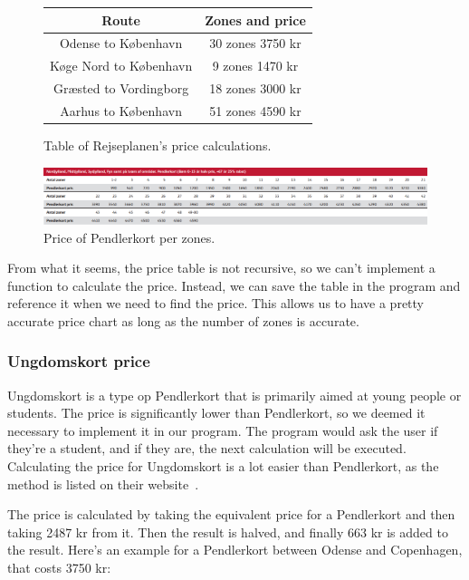 \begin{figure}[H]
    \centering
    \noindent
    \begin{tabular}{ || c | c || }
        \hline
        Route & Zones and price \\
        \hline\hline
        Odense to København & 30 zones 3750 kr \\
        \hline
        Køge Nord to København & 9 zones 1470 kr \\
        \hline
        Græsted to Vordingborg & 18 zones 3000 kr \\
        \hline
        Aarhus to København & 51 zones 4590 kr \\
        \hline
    \end{tabular}
    \caption{Table of Rejseplanen's price calculations.}
    \label{fig:table-rejseplanen-price-calculations}
\end{figure}

\begin{figure}[H]
    \centering
    \includegraphics[width=1\textwidth]{images/dsb-pendlerkort-pris.jpg}
    \caption{Price of Pendlerkort per zones.}
    \label{fig:image-dsb-pendlerkort-pris}
\end{figure}

From what it seems, the price table is not recursive, so we can't implement a function to calculate the price.
Instead, we can save the table in the program and reference it when we need to find the price.
This allows us to have a pretty accurate price chart as long as the number of zones is accurate.

\subsubsection{Ungdomskort price}

Ungdomskort is a type op Pendlerkort that is primarily aimed at young people or students.
The price is significantly lower than Pendlerkort, so we deemed it necessary to implement it in our program.
The program would ask the user if they're a student, and if they are, the next calculation will be executed.
Calculating the price for Ungdomskort is a lot easier than Pendlerkort, as the method is listed on their
website~\cite{price_ung}.

The price is calculated by taking the equivalent price for a Pendlerkort and then taking 2487 kr from it.
Then the result is halved, and finally 663 kr is added to the result.
Here's an example for a Pendlerkort between Odense and Copenhagen, that costs 3750 kr:

